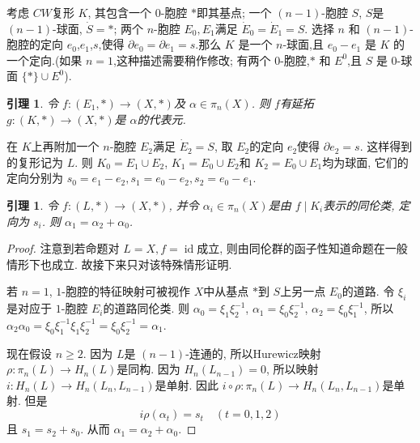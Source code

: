 \documentclass{ctexart}
\theoremstyle{plain}
\newtheorem{lemma}[theorem]{引理}
\theoremstyle{definition}
\begin{document}
            考虑 $CW$复形 $K$, 其包含一个 $0$-胞腔 $*$即其基点; 一个 $(n-1)$-胞腔 $S$, $S$是 $(n-1)$-球面, $\dot{S}=*$; 两个 $n$-胞腔 $E_0,E_1$满足 $\dot{E}_{0}=\dot{E}_{1}=S$. 选择 $n$ 和 $(n-1)$-胞腔的定向 $e_0$,$e_1$,$s$,使得 $\partial e_0 = \partial e_1 = s$.那么 $K$ 是一个 $n$-球面,且 $e_0 - e_1$ 是 $K$ 的一个定向.(如果 $n = 1$,这种描述需要稍作修改; 有两个 0-胞腔,$\ast$ 和 $E^0$,且 $S$ 是 0-球面 $\{\ast\} \cup E^0$).

            \begin{lemma}
                \label{lem:lemma5.10}
                令 $f:(E_1, \ast)\to (X, \ast)$及 $\alpha\in \pi_{n}(X)$. 则 $f$有延拓 $g:(K,\ast)\to (X,\ast)$是 $\alpha$的代表元.
            \end{lemma}

            在 $K$上再附加一个 $n$-胞腔 $E_2$满足 $\dot{E}_{2}=S$, 取 $E_2$的定向 $e_2 $使得 $\partial e_2=s$. 这样得到的复形记为 $L$. 则 $K_0=E_1\cup E_2$, $K_1=E_0\cup E_2$和 $K_2=E_0\cup E_1$均为球面, 它们的定向分别为 $s_0=e_1-e_2, s_1=e_0-e_2, s_2=e_0-e_1$.

            \begin{lemma}
                \label{lemma:lemma5.11}
                令 $f:(L,*)\to (X,*)$, 并令 $\alpha _{i}\in \pi_{n}(X)$是由 $f\mid K_{i}$表示的同伦类, 定向为 $s_{i}$. 则 $\alpha_1=\alpha_2+\alpha_0$.
            \end{lemma}

            \begin{proof}
                注意到若命题对 $L=X,f=\operatorname{id}$成立, 则由同伦群的函子性知道命题在一般情形下也成立. 故接下来只对该特殊情形证明.

                若 $n=1$, $1$-胞腔的特征映射可被视作 $X$中从基点 $*$到 $S$上另一点 $E_0$的道路. 令 $\xi_{i}$是对应于 $1$-胞腔 $E_{i}$的道路同伦类. 则 $\alpha_0=\xi_1\xi_2^{-1}$, $\alpha_1=\xi_0\xi_2^{-1}$, $\alpha_2=\xi_0\xi_1^{-1}$, 所以 $\alpha_2\alpha_0=\xi_0\xi_1^{-1}\xi_1\xi_2^{-1}=\xi_0\xi_2^{-1}=\alpha_1$.

                现在假设 $n\ge 2$. 因为 $L$是 $(n-1)$-连通的, 所以Hurewicz映射 $\rho:\pi_{n}(L)\to H_{n}(L)$是同构. 因为 $H_{n}(L_{n-1})=0$, 所以映射 $i:H_{n}(L)\to H_{n}(L_{n},L_{n-1})$是单射. 因此 $i\circ \rho:\pi_{n}(L)\to H_{n}(L_{n},L_{n-1})$是单射. 但是 
                \begin{equation*}
                  i \rho(\alpha _{t})=s_{t}\quad (t=0,1,2)
                \end{equation*}
                且 $s_1=s_2+s_0$. 从而 $\alpha_1=\alpha_2+\alpha_0$.
            \end{proof}
\end{document}
